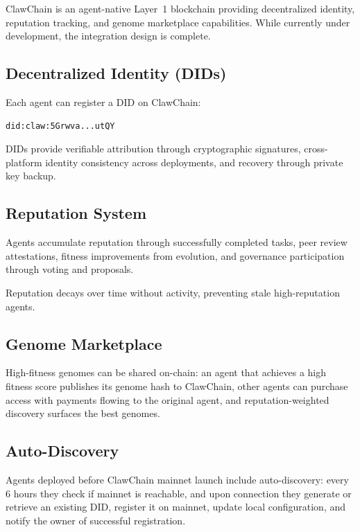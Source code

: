 \documentclass[conference]{IEEEtran}
\begin{document}
ClawChain is an agent-native Layer~1 blockchain providing decentralized identity, reputation tracking, and genome marketplace capabilities. While currently under development, the integration design is complete.

\subsection{Decentralized Identity (DIDs)}

Each agent can register a DID on ClawChain:
\begin{lstlisting}
did:claw:5Grwva...utQY
\end{lstlisting}

DIDs provide verifiable attribution through cryptographic signatures, cross-platform identity consistency across deployments, and recovery through private key backup.

\subsection{Reputation System}

Agents accumulate reputation through successfully completed tasks, peer review attestations, fitness improvements from evolution, and governance participation through voting and proposals.

Reputation decays over time without activity, preventing stale high-reputation agents.

\subsection{Genome Marketplace}

High-fitness genomes can be shared on-chain: an agent that achieves a high fitness score publishes its genome hash to ClawChain, other agents can purchase access with payments flowing to the original agent, and reputation-weighted discovery surfaces the best genomes.

\subsection{Auto-Discovery}

Agents deployed before ClawChain mainnet launch include auto-discovery: every 6 hours they check if mainnet is reachable, and upon connection they generate or retrieve an existing DID, register it on mainnet, update local configuration, and notify the owner of successful registration.
\end{document}
